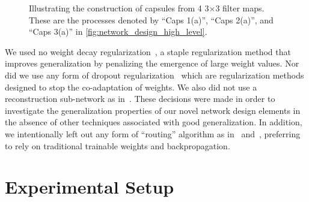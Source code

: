 \documentclass{article}
\begin{document}
\begin{figure}[!ht]
  \centering
  \hspace*{.5in}
  \caption{Illustrating the construction of capsules from 4 3\(\times{}\)3 filter maps.  These are the processes denoted by ``Caps 1(a)'', ``Caps 2(a)'', and ``Caps 3(a)'' in \autoref{fig:network_design_high_level}.}\label{fig:capsule_methods}
\end{figure}

We used no weight decay regularization~\cite{Hinton1987}, a staple regularization method that improves generalization by penalizing the emergence of large weight values.  Nor did we use any form of dropout regularization~\cite{Hinton2012}\cite{Wan2013} which are regularization methods designed to stop the co-adaptation of weights.  We also did not use a reconstruction sub-network as in~\cite{Sabour2017}.  These decisions were made in order to investigate the generalization properties of our novel network design elements in the absence of other techniques associated with good generalization.  In addition, we intentionally left out any form of ``routing'' algorithm as in~\cite{Sabour2017} and~\cite{Hinton2018}, preferring to rely on traditional trainable weights and backpropagation.

\section{Experimental Setup}\label{sec:experimental_setup}
\end{document}
